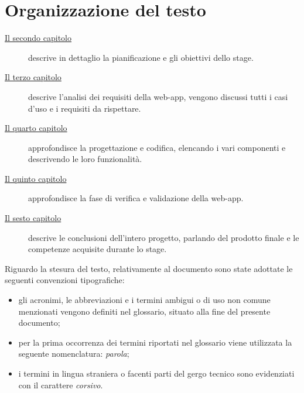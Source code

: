 \section{Organizzazione del testo}

\begin{description}
    \item[{\hyperref[cap:il progetto di stage]{Il secondo capitolo}}] descrive in dettaglio la pianificazione e gli obiettivi dello stage.
    
    \item[{\hyperref[cap:analisi dei requisiti]{Il terzo capitolo}}] descrive l'analisi dei requisiti della web-app, vengono discussi tutti i casi d'uso e i requisiti da rispettare.
    
    \item[{\hyperref[cap:progettazione e codifica]{Il quarto capitolo}}] approfondisce la progettazione e codifica, elencando i vari componenti e descrivendo le loro funzionalità.
    
    
    \item[{\hyperref[cap:verifica]{Il quinto capitolo}}] approfondisce la fase di verifica e validazione della web-app.
    
    \item[{\hyperref[cap:conclusioni]{Il sesto capitolo}}] descrive le conclusioni dell'intero progetto, parlando del prodotto finale e le competenze acquisite durante lo stage.
\end{description}
Riguardo la stesura del testo, relativamente al documento sono state adottate le seguenti convenzioni tipografiche:
\begin{itemize}
	\item gli acronimi, le abbreviazioni e i termini ambigui o di uso non comune menzionati vengono definiti nel glossario, situato alla fine del presente documento;
	\item per la prima occorrenza dei termini riportati nel glossario viene utilizzata la seguente nomenclatura: \emph{parola}\glsfirstoccur;
	\item i termini in lingua straniera o facenti parti del gergo tecnico sono evidenziati con il carattere \emph{corsivo}.
\end{itemize}